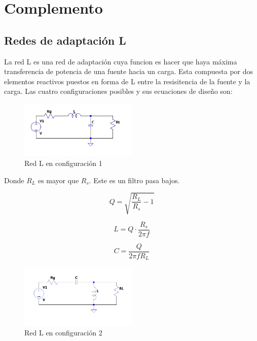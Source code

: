 \section{Complemento}

\subsection{Redes de adaptación L}

La red L es una red de adaptación cuya funcion es hacer que haya máxima transferencia de potencia de una fuente hacia un carga. Esta compuesta por dos elementos reactivos puestos
en forma de L entre la resisitencia de la fuente y la carga. Las cuatro configuraciones posibles y sus ecuaciones de diseño son:


\begin{figure}[H]
    \centering
    \includegraphics[width=0.5\textwidth]{imagenes/redesL1.png}
    \caption{Red L en configuración 1}
    \label{fig:redL1}
\end{figure}

Donde $R_L$ es mayor que $R_s$. Este es un filtro pasa bajos.


\begin{equation}
    Q = \sqrt{\frac{R_L}{R_s}-1}
\end{equation}

\begin{equation}
    L = Q \cdot \frac{R_s}{2 \pi f}
\end{equation}

\begin{equation}
    C = \frac{Q}{2 \pi f R_L}
\end{equation}



\begin{figure}[H]
    \centering
    \includegraphics[width=0.5\textwidth]{imagenes/redesL2.png}
    \caption{Red L en configuración 2}
    \label{fig:redL2}
\end{figure}

